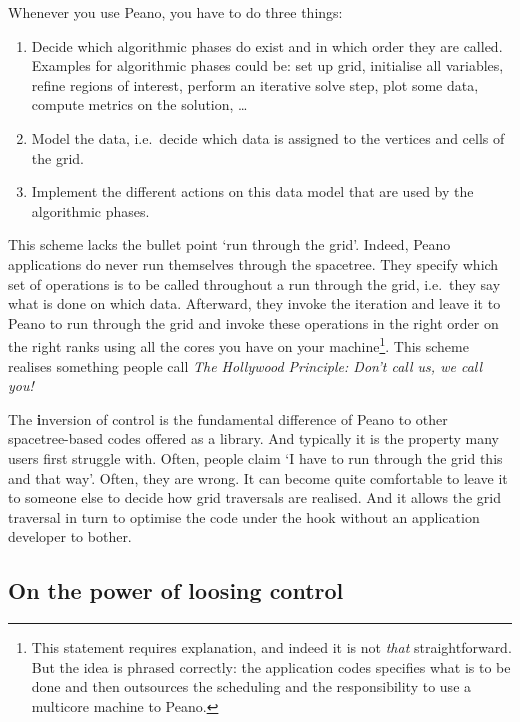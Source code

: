 Whenever you use Peano, you have to do three things:
\begin{enumerate}
  \item Decide which algorithmic phases do exist and in which order they are
  called. Examples for algorithmic phases could be: set up grid, initialise all
  variables, refine regions of interest, perform an iterative solve step, plot
  some data, compute metrics on the solution, \ldots
  \item Model the data, i.e.~decide which data is assigned to the vertices and
  cells of the grid.
  \item Implement the different actions on this data model that are used by the
  algorithmic phases.
\end{enumerate}

\noindent
This scheme lacks the bullet point `run through the grid'. 
Indeed, Peano applications do never run themselves through the spacetree.
They specify which set of operations is to be called throughout a run through
the grid, i.e.~they say what is done on which data.
Afterward, they invoke the iteration and leave it to Peano to run through the
grid and invoke these operations in the right order on the right ranks using all
the cores you have on your machine\footnote{This statement requires
explanation, and indeed it is not {\em that} straightforward. But the idea is
phrased correctly: the application codes specifies what is to be done and then
outsources the scheduling and the responsibility to use a multicore machine to
Peano.}.
This scheme realises something people call {\em The Hollywood Principle: Don't
call us, we call you!}


\begin{remark}
  The {\textbf inversion of control} is the fundamental difference of Peano to other
  spacetree-based codes offered as a library. 
  And typically it is the property many users first struggle with.
  Often, people claim `I have to run through the grid this and that way'. 
  Often, they are wrong.
  It can become quite comfortable to leave it to someone else to decide how 
  grid traversals are realised.
  And it allows the grid traversal in turn to optimise the code under the hook
  without an application developer to bother.
\end{remark}


\subsection{On the power of loosing control}

